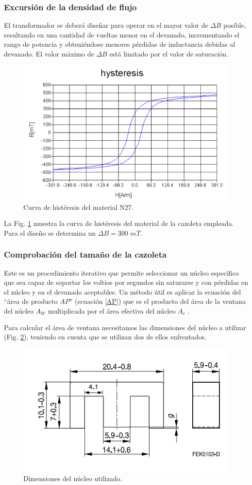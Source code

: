 \documentclass[11pt, a4paper]{article}
\begin{document}
\subsubsection{Excursión de la densidad de flujo}
El transformador se deberá diseñar para operar en el mayor valor de $\Delta B$ posible, resultando en una cantidad de vueltas menor en el devanado, incrementando el rango de potencia y obteniéndose menores pérdidas de inductancia debidas al devanado. El valor máximo de $\Delta B$ está limitado por el valor de saturación.

\begin{figure}[h]
	\centering
	\includegraphics[width = 10 cm]{Imagenes/n27}
	\caption{Curva de histéresis del material N27.}
	\label{n27}
\end{figure}

La Fig. \ref{n27} muestra la curva de histéresis del material de la cazoleta empleada. Para el diseño se determina un $\Delta B = 300$ $mT$.
\subsubsection{Comprobación del tamaño de la cazoleta}
Este es un procedimiento iterativo que permite seleccionar un núcleo específico que sea capaz de soportar los voltios por segundos sin saturarse y con pérdidas en el núcleo y en el devanado aceptables. 
Un método útil es aplicar la ecuación del “área de producto $AP$” (ecuación \ref{AP}) que es el producto del área de la ventana del núcleo $A_W$ multiplicada por el área efectiva del núcleo $A_e$ . 

Para calcular el área de ventana necesitamos las dimensiones del núcleo a utilizar (Fig. \ref{cazoleta}), teniendo en cuenta que se utilizan dos de ellos enfrentados.

\begin{figure}[h]
	\centering
	\includegraphics[width = 10 cm]{Imagenes/cazoleta}
	\caption{Dimensiones del núcleo utilizado.}
	\label{cazoleta}
\end{figure}
\end{document}
